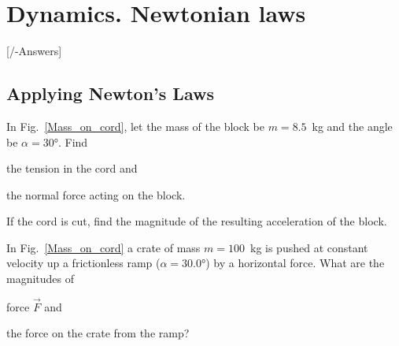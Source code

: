 
\chapter{Dynamics. Newtonian laws}\label{\currfilebase}
[\currfilebase/\currfilebase-Answers]
%

\section{Applying Newton’s Laws}


\begin{problem}\label{prb:Mass_on_cord}
	In Fig.~\ref{Mass_on_cord}, let the mass of the block be $m = 8.5$~\si{\kilo\gram} and the angle be $\alpha = \ang{30}$.
	Find 
	\begin{enumerate*}[label = (\alph*)]
		\item the tension in the cord and
		\item the normal force acting
		on the block.
		\item If the cord is
		cut, find the magnitude of the resulting acceleration of the block.
	\end{enumerate*}
\end{problem}


\begin{problem}\label{prb:ramp}
	In Fig.~\ref{Mass_on_cord} a crate of mass $m = 100$~\si{\kilo\gram} is pushed at constant velocity up a frictionless ramp
	($\alpha = \ang{30.0}$) by a horizontal force. What are the magnitudes of 
		\begin{enumerate*}[label = (\alph*)]
		\item force $\vec F$ and
		\item the force on the crate from the ramp?
	\end{enumerate*}
\end{problem}


